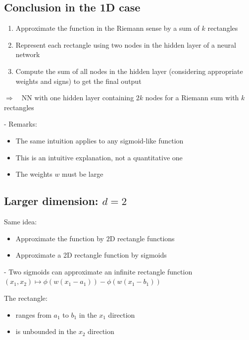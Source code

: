 \subsection*{Conclusion in the 1D case}
\begin{enumerate}
  \item Approximate the function in the Riemann sense by a sum of $k$ rectangles

  \item Represent each rectangle using two nodes in the hidden layer of a neural network

  \item Compute the sum of all nodes in the hidden layer (considering appropriate weights and signs) to get the final output

\end{enumerate}

$\Rightarrow \quad \mathrm{NN}$ with one hidden layer containing $2 k$ nodes for a Riemann sum with $k$ rectangles

- Remarks:

\begin{itemize}
  \item The same intuition applies to any sigmoid-like function
  \item This is an intuitive explanation, not a quantitative one
  \item The weights $w$ must be large
\end{itemize}


\subsection*{Larger dimension: $d=2$}
Same idea:

\begin{itemize}
  \item Approximate the function by $2 \mathrm{D}$ rectangle functions
  \item Approximate a 2D rectangle function by sigmoids
\end{itemize}

- Two sigmoids can approximate an infinite rectangle function
$\left(x_{1}, x_{2}\right) \mapsto \phi\left(w\left(x_{1}-a_{1}\right)\right)-\phi\left(w\left(x_{1}-b_{1}\right)\right)$

The rectangle:

\begin{itemize}
  \item ranges from $a_{1}$ to $b_{1}$ in the $x_{1}$ direction
  \item is unbounded in the $x_{2}$ direction

\end{itemize}

